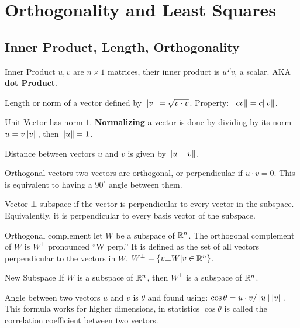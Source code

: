 \section{Orthogonality and Least Squares}
\begin{outline}
\end{outline}

\begin{card}
    \subsection{Inner Product, Length, Orthogonality}

    \begin{compactdesc}
    \item[Inner Product] $u, v$ are $n \times 1$ matrices, their
        inner product is $u^Tv$, a scalar.
        AKA \textbf{dot Product}.
    \item[Length or norm of a vector] defined by $\lVert v\rVert = \sqrt{v \cdot v}$.
        Property: $\lVert cv\rVert = c\lVert v\rVert$.
    \item[Unit Vector] has norm $1$. \textbf{Normalizing} a vector is done by
        dividing by its norm $u = v\lVert v\rVert$, then $\lVert u\rVert = 1$.
    \item[Distance] between vectors $u$ and $v$ is given by $\lVert u - v\rVert$.
    \item[Orthogonal vectors] two vectors are orthogonal, or perpendicular if
        $u \cdot v = 0$. This is equivalent to having a $90^\circ$ angle
        between them.
    \item[Vector $\bot$ subspace] if the vector is perpendicular to every
        vector in the subspace. Equivalently, it is perpendicular to every basis
        vector of the subspace.
    \item[Orthogonal complement] let $W$ be a subspace of $\mathbb{R}^n$.
        The orthogonal complement of $W$ is $W^\bot$ pronounced ``W perp.''
        It is defined as the set of all vectors perpendicular to the vectors in
        $W$, $W^\bot = \{v \bot W | v \in \mathbb{R}^n \}$.
    \item[New Subspace]
        If $W$ is a subspace of $\mathbb{R}^n$, then $W^\bot$ is a subspace of $\mathbb{R}^n$.
    \item[Angle] between two vectors $u$ and $v$ is $\theta$ and found using:
        $\cos \theta = u \cdot v / \lVert u\rVert\lVert v\rVert$.
        This formula works for higher dimensions, in statistics $\cos\theta$
        is called the correlation coefficient between two vectors.
    \end{compactdesc}


\end{card}
